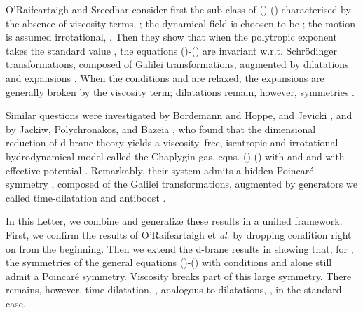 \documentclass[11pt,a4paper]{article}
\def\D{{\cal D}}
\begin{document}
O'Raifeartaigh and Sreedhar consider first the sub-class of
(\coordHE{})-(\coordHE{}) characterised
by
\coordHE{} the absence of viscosity terms, \coordHE{};
\coordHE{} the dynamical field \myHighlight{$\chi$}\coordHE{} is choosen to be
\coordHE{};
\coordHE{} the motion is assumed irrotational,
\coordHE{}.
Then they show that
when the polytropic exponent takes the standard value \coordHE{},
the equations
(\coordHE{})-(\coordHE{}) are invariant w.r.t. Schr\"{o}dinger
transformations, composed of Galilei transformations, augmented by
dilatations and expansions
\cite{NH}. When the conditions \coordHE{} and \coordHE{} are relaxed,
the expansions are generally broken by the viscosity term;
dilatations remain, however, symmetries \cite{RS}.

Similar questions were
investigated by Bordemann and Hoppe, and Jevicki \cite{BoHo},
and by Jackiw, Polychronakos, and Bazeia
\cite{JAC, BJ}, who found that the dimensional reduction
of d-brane theory yields a
viscosity--free, isentropic and irrotational hydrodynamical model
called the Chaplygin gas,
eqns. (\coordHE{})-(\coordHE{}) with \coordHE{} and \coordHE{} and
with effective
potential \coordHE{}.
Remarkably, their system
admits a hidden Poincar\'e symmetry \cite{BoHo, JAC, BJ},
composed of the Galilei transformations,
augmented by \coordHE{} generators we called time-dilatation and antiboost
 \cite{HH}.

\goodbreak
In this Letter, we combine and generalize these results in a unified
framework.
First, we confirm  the results of O'Raifeartaigh
et {\it al}. by dropping condition \coordHE{} right on from the
beginning.
Then we extend the d-brane results in \cite{BoHo, JAC, BJ}
showing that, for \coordHE{}, the symmetries of
the general equations (\coordHE{})-(\coordHE{}) with conditions \coordHE{} and \coordHE{} alone
 still admit a Poincar\'e symmetry.
Viscosity breaks part of this large symmetry.
There remains, however,  time-dilatation,
\coordHE{}, analogous to
dilatations, \myHighlight{$\D$}\coordHE{},  in the standard case.
\goodbreak
\end{document}
